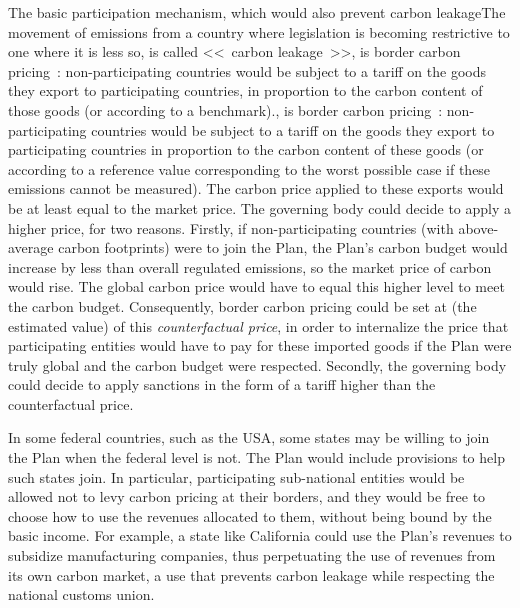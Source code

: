 \documentclass[a5paper,french,openany]{memoir}
\begin{document}
{The basic participation mechanism, which would also prevent carbon leakage{The movement of emissions from a country where legislation is becoming restrictive to one where it is less so, is called <<~carbon leakage~>>}, is border carbon pricing~: non-participating countries would be subject to a tariff on the goods they export to participating countries, in proportion to the carbon content of those goods (or according to a benchmark).}, is border carbon pricing~: non-participating countries would be subject to a tariff on the goods they export to participating countries in proportion to the carbon content of these goods (or according to a reference value corresponding to the worst possible case if these emissions cannot be measured). The carbon price applied to these exports would be at least equal to the market price. The governing body could decide to apply a higher price, for two reasons. Firstly, if non-participating countries (with above-average carbon footprints) were to join the Plan, the Plan's carbon budget would increase by less than overall regulated emissions, so the market price of carbon would rise. The global carbon price would have to equal this higher level to meet the carbon budget. Consequently, border carbon pricing could be set at (the estimated value) of this \textit{counterfactual price}, in order to internalize the price that participating entities would have to pay for these imported goods if the Plan were truly global and the carbon budget were respected. Secondly, the governing body could decide to apply sanctions in the form of a tariff higher than the counterfactual price. 

In some federal countries, such as the USA, some states may be willing to join the Plan when the federal level is not. The Plan would include provisions to help such states join. In particular, participating sub-national entities would be allowed not to levy carbon pricing at their borders, and they would be free to choose how to use the revenues allocated to them, without being bound by the basic income. 
For example, a state like California could use the Plan's revenues to subsidize manufacturing companies, thus perpetuating the use of revenues from its own carbon market, a use that prevents carbon leakage while respecting the national customs union.
\end{document}
